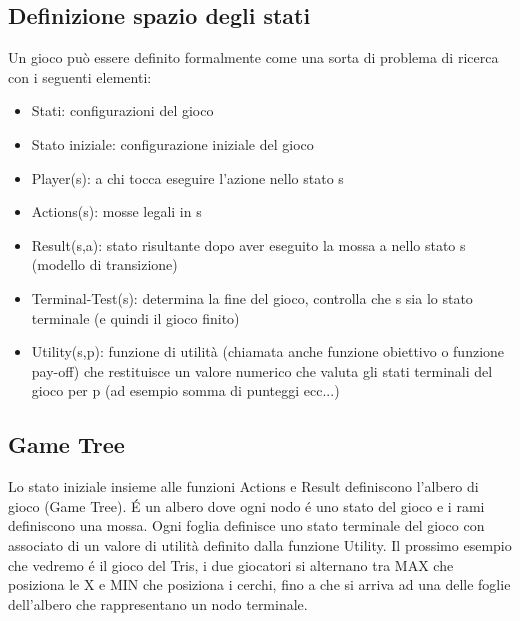 \documentclass{article}
\begin{document}
\subsection{Definizione spazio degli stati}
Un gioco può essere definito formalmente come una sorta di problema di ricerca con i seguenti elementi:
\begin{itemize}
    \item Stati: configurazioni del gioco
    \item Stato iniziale: configurazione iniziale del gioco
    \item Player(s): a chi tocca eseguire l'azione nello stato s
    \item Actions(s): mosse legali in s
    \item Result(s,a): stato risultante dopo aver eseguito la mossa a nello stato s (modello di transizione)
    \item Terminal-Test(s): determina la fine del gioco, controlla che s sia lo stato terminale (e quindi il gioco finito)
    \item Utility(s,p): funzione di utilità (chiamata anche funzione obiettivo o funzione pay-off) che restituisce un valore numerico che valuta gli stati terminali del gioco per p (ad esempio somma di punteggi ecc...)
\end{itemize}

\subsection{Game Tree}
Lo stato iniziale insieme alle funzioni Actions e Result definiscono l'albero di gioco (Game Tree). É un albero dove ogni nodo é uno stato del gioco e i rami definiscono una mossa. Ogni foglia definisce uno stato terminale del gioco con associato di un valore di utilità definito dalla funzione Utility. \newline
Il prossimo esempio che vedremo é il gioco del Tris, i due giocatori si alternano tra MAX che posiziona le X e MIN che posiziona i cerchi, fino a che si arriva ad una delle foglie dell'albero che rappresentano un nodo terminale.
\clearpage
\end{document}
